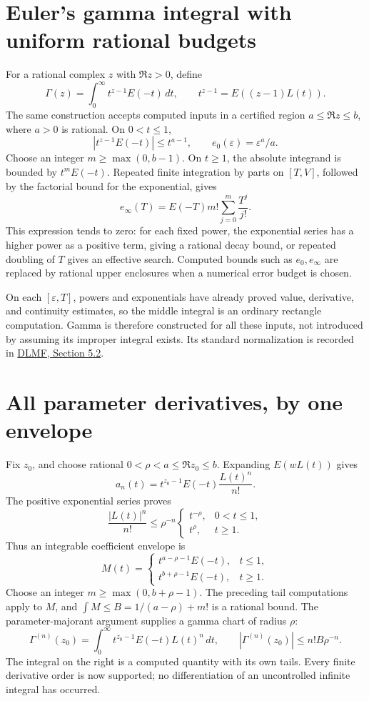 \section{Euler's gamma integral with uniform rational budgets}
For a rational complex $z$ with $\Re z>0$, define
\[
 \Gamma(z)=\int_0^\infty t^{z-1}E(-t)\,dt,
 \qquad t^{z-1}=E((z-1)L(t)).
\]
The same construction accepts computed inputs in a certified region
$a\le\Re z\le b$, where $a>0$ is rational.  On $0<t\le1$,
\[
 |t^{z-1}E(-t)|\le t^{a-1},\qquad e_0(\varepsilon)=\varepsilon^a/a.
\]
Choose an integer $m\ge\max(0,b-1)$.  On $t\ge1$, the absolute
integrand is bounded by $t^mE(-t)$.  Repeated finite integration by parts
on $[T,V]$, followed by the factorial bound for the exponential, gives
\[
 e_\infty(T)=E(-T)m!\sum_{j=0}^m\frac{T^j}{j!}.
\]
This expression tends to zero: for each fixed power, the exponential
series has a higher power as a positive term, giving a rational decay
bound, or repeated doubling of $T$ gives an effective search.  Computed
bounds such as $e_0,e_\infty$ are replaced by rational upper enclosures
when a numerical error budget is chosen.

On each $[\varepsilon,T]$, powers and exponentials have already proved
value, derivative, and continuity estimates, so the middle integral is
an ordinary rectangle computation.  Gamma is therefore constructed for
all these inputs, not introduced by assuming its improper integral exists.
Its standard normalization is recorded in
\href{https://dlmf.nist.gov/5.2}{DLMF, Section 5.2}.

\section{All parameter derivatives, by one envelope}
Fix $z_0$, and choose rational $0<\rho<a\le\Re z_0\le b$.
Expanding $E(wL(t))$ gives
\[
 a_n(t)=t^{z_0-1}E(-t)\frac{L(t)^n}{n!}.
\]
The positive exponential series proves
\[
 \frac{|L(t)|^n}{n!}\le\rho^{-n}
 \begin{cases}t^{-\rho},&0<t\le1,\\t^\rho,&t\ge1.\end{cases}
\]
Thus an integrable coefficient envelope is
\[
 M(t)=\begin{cases}t^{a-\rho-1}E(-t),&t\le1,\\
                   t^{b+\rho-1}E(-t),&t\ge1.
       \end{cases}
\]
Choose an integer $m\ge\max(0,b+\rho-1)$.  The preceding tail computations
apply to $M$, and $\int M\le B=1/(a-\rho)+m!$ is a rational bound.
The parameter-majorant argument supplies a gamma chart of radius $\rho$:
\[
 \Gamma^{(n)}(z_0)=\int_0^\infty t^{z_0-1}E(-t)L(t)^n\,dt,
 \qquad |\Gamma^{(n)}(z_0)|\le n!B\rho^{-n}.
\]
The integral on the right is a computed quantity with its own tails.
Every finite derivative order is now supported; no differentiation of an
uncontrolled infinite integral has occurred.


